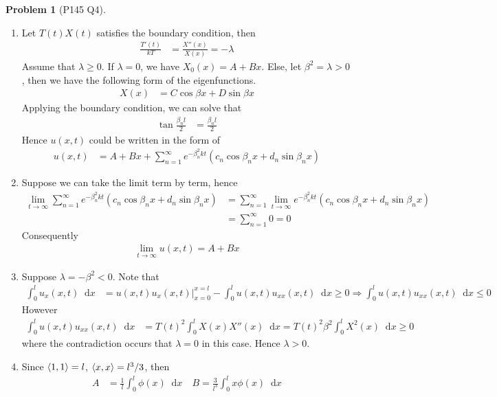 \documentclass[twoside,11pt]{article}
\renewcommand*\d{\mathop{}\!\mathrm{d}}
\theoremstyle{definition}
\newtheorem{problem}{Problem}
\theoremstyle{remark}
\begin{document}
\begin{problem}[P145 Q4]\
\begin{enumerate}[label=(\alph*)]
\item Let $T(t)X(t)$ satisfies the boundary condition, then
\begin{align*}
    \frac{T'(t)}{kT} &= \frac{X''(x)}{X(x)} = -\lambda
\end{align*}
Assume that $\lambda\geq 0$.
If $\lambda=0$, we have $X_0(x) = A + Bx$.
Else, let $\beta^2=\lambda> 0$, then we have the following form of 
the eigenfunctions.
\begin{align*}
    X(x) &= C\cos\beta x + D\sin\beta x
\end{align*}
Applying the boundary condition, we can solve that
\begin{align*}
    \tan\frac{\beta_n l}{2} &= \frac{\beta_n l}{2}
\end{align*}
Hence $u(x, t)$ could be written in the form of
\begin{align*}
    u(x, t) &= 
    A + Bx + 
    \sum_{n=1}^\infty e^{-\beta_n^2kt}(c_n\cos\beta_nx + d_n\sin\beta_n x)
\end{align*}

\item Suppose we can take the limit term by term, hence
\begin{align*}
    \lim_{t\rightarrow \infty}
    \sum_{n=1}^\infty e^{-\beta_n^2kt}(c_n\cos\beta_nx + d_n\sin\beta_n x)
    &= \sum_{n=1}^\infty
    \lim_{t\rightarrow \infty}
    e^{-\beta_n^2kt}(c_n\cos\beta_nx + d_n\sin\beta_n x)\\
    &= \sum_{n=1}^\infty 0 = 0
\end{align*}
Consequently
\begin{align*}
    \lim_{t\rightarrow \infty} u(x,t) = A + Bx
\end{align*}

\item Suppose $\lambda=-\beta^2<0$.
Note that
\begin{align*}
    \int_0^l u_x(x, t)\d x &= \left .u(x,t)u_x(x, t)\right |_{x=0}^{x=l}
    - \int_0^l u(x, t)u_{xx}(x, t)\d x \geq 0
    \Rightarrow \int_0^l u(x, t)u_{xx}(x, t)\d x \leq 0
\end{align*}
However
\begin{align*}
    \int_0^l u(x, t)u_{xx}(x, t)\d x &= T(t)^2\int_0^l X(x)X''(x)\d x
    = T(t)^2\beta^2 \int_0^l X^2(x)\d x \geq 0 
\end{align*}
where the contradiction occurs that $\lambda = 0$ in this case.
Hence $\lambda>0$.

\item Since $\braket{1,1}=l$, $\braket{x,x}=l^3/3$, then
\begin{align*}
    A &= \frac{1}{l}\int_0^l\phi(x)\d x \quad
    B = \frac{3}{l^3}\int_0^l x\phi(x)\d x
\end{align*}

\end{enumerate}
\end{problem}
\end{document}
